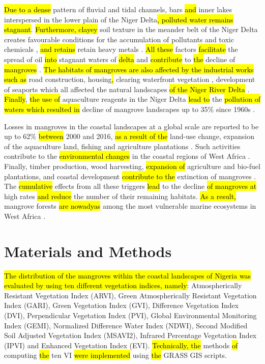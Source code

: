 \documentclass[jmse,article,submit,pdftex,moreauthors]{Definitions/mdpi}
\begin{document}
\hl{Due to a dense }pattern of fluvial and tidal channels, bars \hl{and} inner lakes interspersed in the lower plain of the Niger Delta\hl{, polluted water remains stagnant}. \hl{Furthermore, clayey} soil texture in the meander belt of the Niger Delta \cite{Kamalu} creates favourable conditions for the accumulation of pollutants and toxic chemicals \cite{w13223295,toxics11010006,UKHUREBOR2021112872}, \hl{and retains} retain heavy metals \cite{Amusan,OKOYE2022100222,OKOYE2021111273}. \hl{All these} factors \hl{facilitate} the spread of oil \hl{into} stagnant waters of \hl{delta} and \hl{contribute} to \hl{the} decline of \hl{mangroves} \cite{ONYIA2020377,ODISU2021111993,ZABBEY2014167}. \hl{The habitats of mangroves are also affected by the industrial works such as }road construction, housing\hl{, }clearing waterfront vegetation \cite{Zabbey}, development of seaports which all affected the natural landscapes \hl{of the Niger River Delta} \cite{OMIUNU198957}. \hl{Finally}, \hl{the use of} aquaculture reagents in the Niger Delta \hl{lead to }the \hl{pollution of waters which resulted in }decline of mangrove landscapes up to 35\% since 1960s \cite{Godstime}. 

Losses in mangroves in the coastal landscapes at a global scale are reported to be up to 62\% \hl{between} 2000 and 2016, \hl{as a result of the } land-use change,\hl{ }expansion of the aquaculture land, fishing and agriculture plantations \cite{Goldberg}. Such activities\hl{ }contribute to the \hl{environmental changes }in the coastal regions of West Africa \cite{land11111982,su12187349,Babanyara}. Finally, timber production, wood harvesting, \hl{expansion of} agriculture and bio-fuel plantations, and coastal development \hl{contribute to the} extinction of mangroves \cite{Feka}. The \hl{cumulative} effects from all these triggers \hl{lead} to the decline \hl{of mangroves at }high rates\hl{ and reduce} the number of their remaining habitats. \hl{As a result, }mangrove forests \hl{are nowadyas} among the most vulnerable marine ecosystems in West Africa \cite{ORIJEMIE2012360}. 

\section{Materials and Methods}

\hl{The distribution of the mangroves within the coastal landscapes of Nigeria was evaluated by using ten different vegetation indices, namely}: Atmospherically Resistant Vegetation Index (ARVI), Green Atmospherically Resistant Vegetation Index (GARI), Green Vegetation Index (GVI), Difference Vegetation Index (DVI), Perpendicular Vegetation Index (PVI), Global Environmental Monitoring Index (GEMI), Normalized Difference Water Index (NDWI), Second Modified Soil Adjusted Vegetation Index (MSAVI2), Infrared Percentage Vegetation Index (IPVI) and Enhanced Vegetation Index (EVI). \hl{Technically, the }methods \hl{of} computing \hl{the }ten VI \hl{were implemented} using \hl{the }GRASS GIS scripts. 
\end{document}
